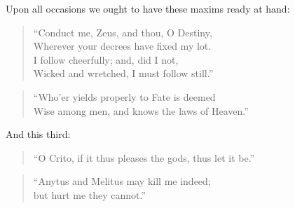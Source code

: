 Upon all occasions we ought to have these maxims ready at hand:

\begin{quote}
  ``Conduct me, Zeus, and thou, O Destiny, \\
  Wherever your decrees have fixed my lot. \\
  I follow cheerfully; and, did I not, \\
  Wicked and wretched, I must follow still.''\footnotemark
\end{quote}

\begin{quote}
  ``Who'er yields properly to Fate is deemed \\
  Wise among men, and knows the laws of Heaven.''\footnotemark
\end{quote}

And this third:

\begin{quote}
  ``O Crito, if it thus pleases the gods, thus let it be.''\footnotemark
\end{quote}

\begin{quote}
  ``Anytus and Melitus may kill me indeed; \\
  but hurt me they cannot.''\footnotemark
\end{quote}
